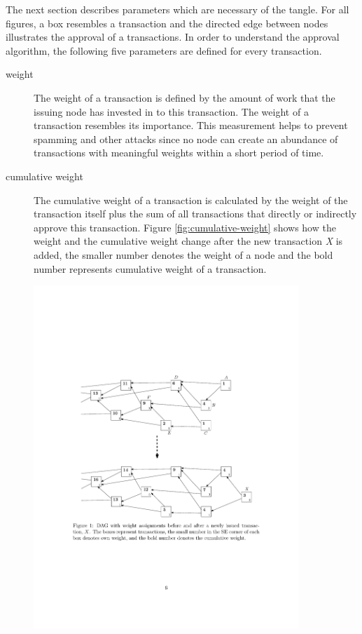 The next section describes parameters which are necessary of the tangle. For all figures, a box resembles a transaction and the directed edge between nodes illustrates the approval of a transactions. In order to understand the approval algorithm, the following five parameters are defined for every transaction.
\begin{description}
    \item[weight] The weight of a transaction is defined by the amount of work that the issuing node has invested in to this transaction. The weight of a transaction resembles its importance. This measurement helps to prevent spamming and other attacks since no node can create an abundance of transactions with meaningful weights within a short period of time. 
    \item[cumulative weight] The cumulative weight of a transaction is calculated by the weight of the transaction itself plus the sum of all transactions that directly or indirectly approve this transaction. Figure \ref{fig:cumulative-weight} shows how the weight and the cumulative weight change after the new transaction \textit{X} is added, the smaller number denotes the weight of a node and the bold number represents cumulative weight of a transaction.\par
        \begin{minipage}{\linewidth}
            \centering
            \includegraphics[width=10cm]{images/cummulative_weight.pdf}

\end{minipage}
\end{description}
